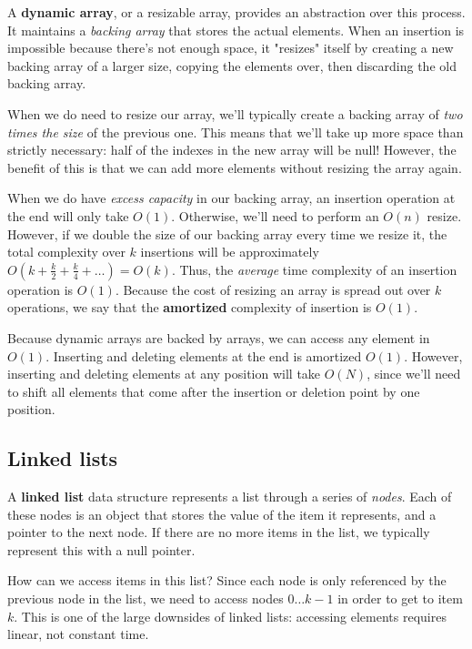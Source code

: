 A \textbf{dynamic array}, or a resizable array, provides an abstraction over this process. It maintains a \textit{backing array} that stores the actual elements. When an insertion is impossible because there's not enough space, it "resizes" itself by creating a new backing array of a larger size, copying the elements over, then discarding the old backing array.

When we do need to resize our array, we'll typically create a backing array of \textit{two times the size} of the previous one. This means that we'll take up more space than strictly necessary: half of the indexes in the new array will be null! However, the benefit of this is that we can add more elements without resizing the array again.

When we do have \textit{excess capacity} in our backing array, an insertion operation at the end will only take $O(1)$. Otherwise, we'll need to perform an $O(n)$ resize. However, if we double the size of our backing array every time we resize it, the total complexity over $k$ insertions will be approximately $O(k + \frac{k}{2} + \frac{k}{4} + \dots) = O(k)$. Thus, the \textit{average} time complexity of an insertion operation is $O(1)$. Because the cost of resizing an array is spread out over $k$ operations, we say that the \textbf{amortized} complexity of insertion is $O(1)$.

Because dynamic arrays are backed by arrays, we can access any element in $O(1)$. Inserting and deleting elements at the end is amortized $O(1)$. However, inserting and deleting elements at any position will take $O(N)$, since we'll need to shift all elements that come after the insertion or deletion point by one position.


\subsection{Linked lists}

A \textbf{linked list} data structure represents a list through a series of \textit{nodes}. Each of these nodes is an object that stores the value of the item it represents, and a pointer to the next node. If there are no more items in the list, we typically represent this with a null pointer.

How can we access items in this list? Since each node is only referenced by the previous node in the list, we need to access nodes $0 \dots k-1$ in order to get to item $k$. This is one of the large downsides of linked lists: accessing elements requires linear, not constant time.

